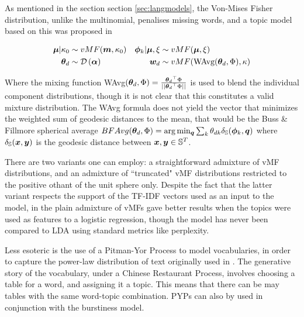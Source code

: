 As mentioned in the section section \ref{sec:langmodels}, the Von-Mises Fisher distribution, unlike the multinomial, penalises missing words, and a topic model based on this was proposed in \cite{Reisinger2010}

\begin{align}
\bm \mu | \kappa_0 & \sim  vMF(\bm m, \kappa_0) &
\bm \phi_k | \bm \mu, \xi & \sim  vMF(\bm \mu, \xi) \\
{ \bm \theta_d } & \sim  \mathcal{D} \left( {\bm \alpha} \right) &
{ \bm w_d } & \sim  vMF(\text{WAvg}({ \bm \theta_d }, \Phi), \kappa) 
\end{align} 

Where the mixing function WAvg$({ \bm \theta_d }, \Phi) = \frac{{ \bm \theta_d }^\top\Phi}{||{ \bm \theta_d }^\top\Phi||}$ is used to blend the individual component distributions, though it is not clear that this constitutes a valid mixture distribution.  The WAvg formula does not yield the vector that minimizes the weighted sum of geodesic distances to the mean, that would be the  Buss \& Fillmore spherical average $BFAvg({ \bm \theta_d },\Phi) = \arg \min_{\bm q} \sum_k { \theta_{dk} } \delta_\mathbb{S}(\bm \phi_k, \bm q)$ where $\delta_\mathbb{S}(\bm x, \bm y)$ is the geodesic distance between $\bm x, \bm y \in \mathbb{S}^T$. 

There are two variants one can employ: a straightforward admixture of vMF distributions, and an admixture of ``truncated" vMF distributions restricted to the positive othant of the unit sphere only. Despite the fact that the latter variant respects the support of the TF-IDF vectors used as an input to the model, in \cite{Reisinger2010} the plain admixture of vMFs gave better results when the topics were used as features to a logistic regression, though the model has never been compared to LDA using standard metrics like perplexity.

Less esoteric is the use of a Pitman-Yor Process to model vocabularies, in order to capture the power-law distribution of text originally used in \cite{Sato2010}. The generative story of the vocabulary, under a Chinese Restaurant Process, involves choosing a table for a word, and assigning it a topic. This means that there can be may tables with the same word-topic combination. PYPs can also by used in conjunction with the burstiness model\cite{Buntine2014}.


%
%

